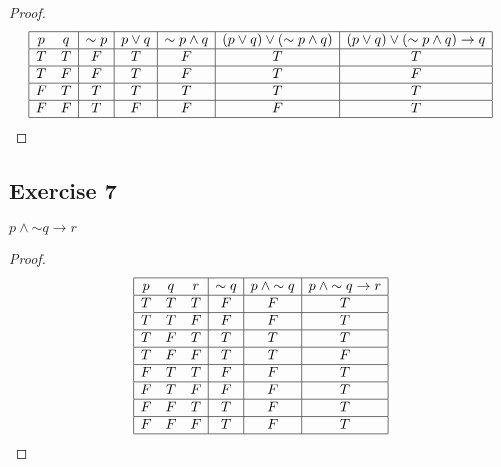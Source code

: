\documentclass[14pt]{extarticle}
\begin{document}
\begin{proof}
    $$
        \begin{array}{|cc|c|c|c|c|c|}
            \hline
            p & q & {\sim p} & p \vee q & {\sim p} \wedge q & (p \vee q) \vee ({\sim p} \wedge q) & (p \vee q) \vee ({\sim p} \wedge q) \to q \\
            \hline
            T & T & F        & T        & F                 & T                                   & T                                         \\
            \hline
            T & F & F        & T        & F                 & T                                   & F                                         \\
            \hline
            F & T & T        & T        & T                 & T                                   & T                                         \\
            \hline
            F & F & T        & F        & F                 & F                                   & T                                         \\
            \hline
        \end{array}
    $$
\end{proof}

\subsection{Exercise 7}
$p \wedge {\sim q} \to r$

\begin{proof}
    $$
        \begin{array}{|ccc|c|c|c|}
            \hline
            p & q & r & {\sim q} & p \wedge {\sim q} & p \wedge {\sim q} \to r \\
            \hline
            T & T & T & F        & F                 & T                       \\
            \hline
            T & T & F & F        & F                 & T                       \\
            \hline
            T & F & T & T        & T                 & T                       \\
            \hline
            T & F & F & T        & T                 & F                       \\
            \hline
            F & T & T & F        & F                 & T                       \\
            \hline
            F & T & F & F        & F                 & T                       \\
            \hline
            F & F & T & T        & F                 & T                       \\
            \hline
            F & F & F & T        & F                 & T                       \\
            \hline
        \end{array}
    $$
\end{proof}
\end{document}
